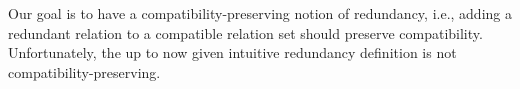 

%     

Our goal is to have a compatibility-preserving notion of redundancy, i.e., adding a redundant relation to a compatible relation set should preserve compatibility.
Unfortunately, the up to now given intuitive redundancy definition is not compatibility-preserving. %

